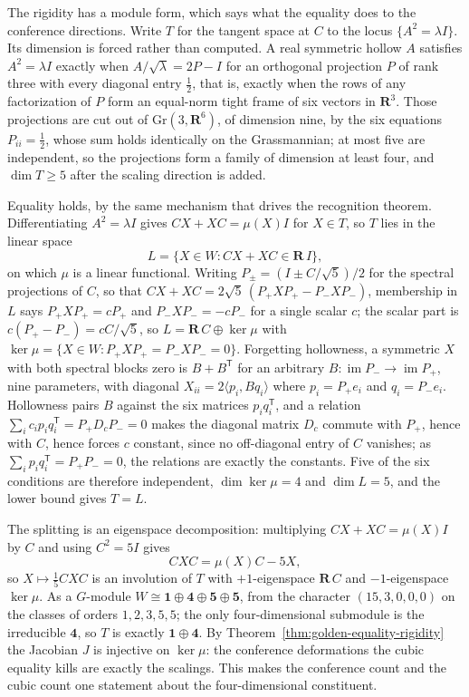 The rigidity has a module form, which says what the equality does to the
conference directions.  Write \(T\) for the tangent space at \(C\) to the locus
\(\{A^2=\lambda I\}\).  Its dimension is forced rather than computed.  A real
symmetric hollow \(A\) satisfies \(A^2=\lambda I\) exactly when
\(A/\sqrt\lambda=2P-I\) for an orthogonal projection \(P\) of rank three with
every diagonal entry \(\tfrac12\), that is, exactly when the rows of any
factorization of \(P\) form an equal-norm tight frame of six vectors in
\(\mathbf R^3\).  Those projections are cut out of \(\mathrm{Gr}(3,\mathbf R^6)\),
of dimension nine, by the six equations \(P_{ii}=\tfrac12\), whose sum holds
identically on the Grassmannian; at most five are independent, so the projections
form a family of dimension at least four, and \(\dim T\ge5\) after the scaling
direction is added.

Equality holds, by the same mechanism that drives the recognition theorem.
Differentiating \(A^2=\lambda I\) gives \(CX+XC=\mu(X)I\) for \(X\in T\), so
\(T\) lies in the linear space
\[
 L=\{X\in W:CX+XC\in\mathbf R\,I\},
\]
on which \(\mu\) is a linear functional.  Writing \(P_\pm=(I\pm C/\sqrt5)/2\)
for the spectral projections of \(C\), so that
\(CX+XC=2\sqrt5\,(P_+XP_+-P_-XP_-)\), membership in \(L\) says
\(P_+XP_+=cP_+\) and \(P_-XP_-=-cP_-\) for a single scalar \(c\); the scalar
part is \(c(P_+-P_-)=cC/\sqrt5\), so \(L=\mathbf R\,C\oplus\ker\mu\) with
\(\ker\mu=\{X\in W:P_+XP_+=P_-XP_-=0\}\).  Forgetting hollowness, a symmetric
\(X\) with both spectral blocks zero is \(B+B^{\mathsf T}\) for an arbitrary
\(B\colon\operatorname{im}P_-\to\operatorname{im}P_+\), nine parameters, with
diagonal \(X_{ii}=2\langle p_i,Bq_i\rangle\) where \(p_i=P_+e_i\) and
\(q_i=P_-e_i\).  Hollowness pairs \(B\) against the six matrices
\(p_iq_i^{\mathsf T}\), and a relation
\(\sum_ic_ip_iq_i^{\mathsf T}=P_+D_cP_-=0\) makes the diagonal matrix \(D_c\)
commute with \(P_+\), hence with \(C\), hence forces \(c\) constant, since no
off-diagonal entry of \(C\) vanishes; as \(\sum_ip_iq_i^{\mathsf T}=P_+P_-=0\),
the relations are exactly the constants.  Five of the six conditions are
therefore independent, \(\dim\ker\mu=4\) and \(\dim L=5\), and the lower bound
gives \(T=L\).

The splitting is an eigenspace decomposition: multiplying \(CX+XC=\mu(X)I\)
by \(C\) and using \(C^2=5I\) gives
\[
 CXC=\mu(X)C-5X,
\]
so \(X\mapsto\tfrac15CXC\) is an involution of \(T\) with \(+1\)-eigenspace
\(\mathbf R\,C\) and \(-1\)-eigenspace \(\ker\mu\).  As a \(G\)-module
\(W\cong\mathbf1\oplus\mathbf4\oplus\mathbf5\oplus\mathbf5\), from the
character \((15,3,0,0,0)\) on the classes of orders \(1,2,3,5,5\); the only
four-dimensional submodule is the irreducible \(\mathbf4\), so \(T\) is
exactly \(\mathbf1\oplus\mathbf4\).  By
Theorem~\ref{thm:golden-equality-rigidity} the Jacobian \(J\) is injective on
\(\ker\mu\): the conference deformations the cubic equality kills are exactly
the scalings.  This makes the conference count and the cubic count one
statement about the four-dimensional constituent.


